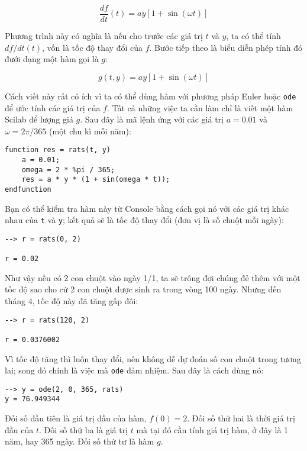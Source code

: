 \documentclass[12pt]{book}
\begin{document}
\[ \frac{df}{dt}(t) = a y \left[1 + \sin (\omega t) \right] \]

Phương trình này có nghĩa là nếu cho trước các giá trị $t$ và $y$, 
ta có thể tính $df/dt(t)$, vốn là tốc độ thay đổi của $f$. Bước
tiếp theo là biểu diễn phép tính đó đưới dạng một hàm gọi là $g$:

\[ g(t, y) = a y \left[1 + \sin (\omega t) \right] \]

Cách viết này rất có ích vì ta có thể dùng hàm với phương pháp
Euler hoặc {\tt ode} để ước tính các giá trị của $f$. Tất cả những
việc ta cần làm chỉ là viết một hàm Scilab để lượng giá $g$. 
Sau đây là mã lệnh ứng với các giá trị $a = 0.01$ và 
$\omega = 2 \pi/365$ (một chu kì mỗi năm):

\begin{verbatim}
function res = rats(t, y)
    a = 0.01;
    omega = 2 * %pi / 365;
    res = a * y * (1 + sin(omega * t));
endfunction
\end{verbatim}
%
Bạn có thể kiểm tra hàm này từ Console bằng cách 
gọi nó với các giá trị khác nhau của {\tt t} và {\tt y}; kết quả sẽ là
tốc độ thay đổi (đơn vị là số chuột mỗi ngày):

\begin{verbatim}
--> r = rats(0, 2)

r = 0.02
\end{verbatim}
%
Như vậy nếu có 2 con chuột vào ngày 1/1, ta sẽ trông đợi chúng
đẻ thêm với một tốc độ sao cho cứ 2 con chuột được sinh ra trong
vòng 100 ngày. Nhưng đến tháng 4, tốc độ này đã tăng gấp đôi:

\begin{verbatim}
--> r = rats(120, 2)

r = 0.0376002
\end{verbatim}
%
Vì tốc độ tăng thì luôn thay đổi, nên không dễ dự đoán số con 
chuột trong tương lai; song đó chính là việc mà {\tt ode} đảm nhiệm.
Sau đây là cách dùng nó:

\begin{verbatim}
--> y = ode(2, 0, 365, rats)
y = 76.949344
\end{verbatim}
%
Đối số đầu tiên là giá trị đầu của hàm,  $f(0) = 2$.
Đối số thứ hai là thời giá trị đầu của $t$. 
Đối số thứ ba là giá trị $t$ mà tại đó cần tính giá trị hàm, ở đây là 1 năm, hay
365 ngày. Đối số thứ tư là hàm $g$.

%
%
\end{document}
